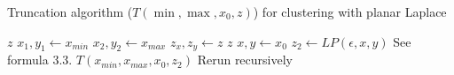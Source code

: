 \begin{algorithm}
  \caption{Truncation algorithm ($T(\min, \max, x_0, z)$) for clustering with planar Laplace}\label{alg:truncaction-rq1}
  \begin{algorithmic}
    \Ensure $z$
    \State $x_1, y_1 \gets x_{min}$
    \State $x_2, y_2 \gets x_{max}$
    \State $z_x, z_y \gets z$
    \State \Return $z$
    \Else
    \State $x, y \gets x_0$
    \State $z_2 \gets LP(\epsilon, x, y)$ \Comment See formula 3.3.
    \State \Return $T(x_{min}, x_{max}, x_0, z_2)$ \Comment Rerun recursively
    \EndIf
  \end{algorithmic}
\end{algorithm}